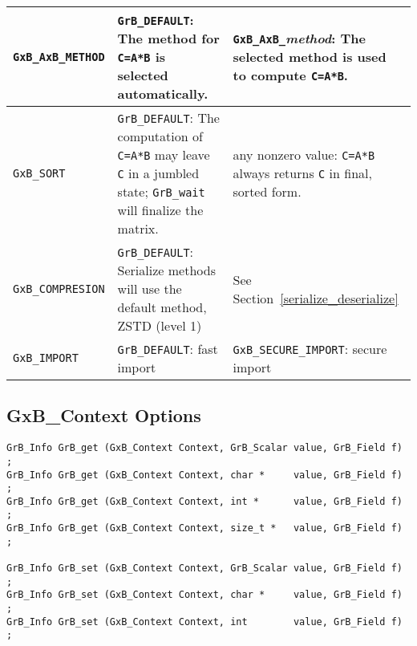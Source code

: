{\begin{tabular}{|l|p{2.4in}|p{2.2in}|}
\verb'GxB_AxB_METHOD'
    & \verb'GrB_DEFAULT':
    The method for \verb'C=A*B' is selected automatically.
    & \verb'GxB_AxB_'{\em method}: The selected method is used to compute
    \verb'C=A*B'.  \\

\hline

\verb'GxB_SORT'
    & \verb'GrB_DEFAULT':
    The computation of \verb'C=A*B' may leave \verb'C' in a jumbled state;
    \verb'GrB_wait' will finalize the matrix.
    & any nonzero value: \verb'C=A*B' always returns \verb'C' in final,
    sorted form. \\

\hline

\verb'GxB_COMPRESION'
    & \verb'GrB_DEFAULT':
    Serialize methods will use the default method, ZSTD (level 1)
    & See Section~\ref{serialize_deserialize} \\

\hline

\verb'GxB_IMPORT'
    & \verb'GrB_DEFAULT': fast import
    & \verb'GxB_SECURE_IMPORT': secure import \\

\hline
\end{tabular}
}


\newpage
\subsection{{\sf GxB\_Context} Options}
\label{get_set_context}

\begin{mdframed}[userdefinedwidth=6in]
{\footnotesize
\begin{verbatim}
GrB_Info GrB_get (GxB_Context Context, GrB_Scalar value, GrB_Field f) ;
GrB_Info GrB_get (GxB_Context Context, char *     value, GrB_Field f) ;
GrB_Info GrB_get (GxB_Context Context, int *      value, GrB_Field f) ;
GrB_Info GrB_get (GxB_Context Context, size_t *   value, GrB_Field f) ;

GrB_Info GrB_set (GxB_Context Context, GrB_Scalar value, GrB_Field f) ;
GrB_Info GrB_set (GxB_Context Context, char *     value, GrB_Field f) ;
GrB_Info GrB_set (GxB_Context Context, int        value, GrB_Field f) ;
\end{verbatim}
}\end{mdframed}

